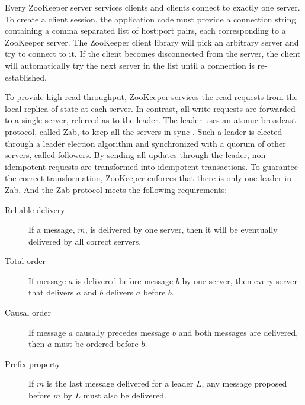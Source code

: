 \documentclass[11pt]{book}
\begin{document}
Every ZooKeeper server services clients and clients connect to exactly one server. To create a client session, the application code must provide a connection string containing a comma separated list of host:port pairs, each corresponding to a ZooKeeper server. The ZooKeeper client library will pick an arbitrary server and try to connect to it. If the client becomes disconnected from the server, the client will automatically try the next server in the list until a connection is re-established.

To provide high read throughput, ZooKeeper services the read requests from the local replica of state at each server. In contrast, all write requests are forwarded to a single server, referred as to the leader. The leader uses an atomic broadcast protocol, called Zab, to keep all the servers in sync \cite{Reed:2008:STO}. Such a leader is elected through a leader election algorithm and synchronized with a quorum of other servers, called followers. By sending all updates through the leader, non-idempotent requests are transformed into idempotent transactions. To guarantee the correct transformation, ZooKeeper enforces that there is only one leader in Zab. And the Zab protocol meets the following requirements:
\begin{description}
\item[Reliable delivery] If a message, $m$, is delivered by one server, then it will be eventually delivered by all correct servers.
\item[Total order] If message $a$ is delivered before message $b$ by one server, then every server that delivers $a$ and $b$ delivers $a$ before $b$.
\item[Causal order] If message $a$ causally precedes message $b$ and both messages are delivered, then $a$ must be ordered before $b$.
\item[Prefix property] If $m$ is the last message delivered for a leader $L$, any message proposed before $m$ by $L$ must also be delivered.
\end{description}
\end{document}
